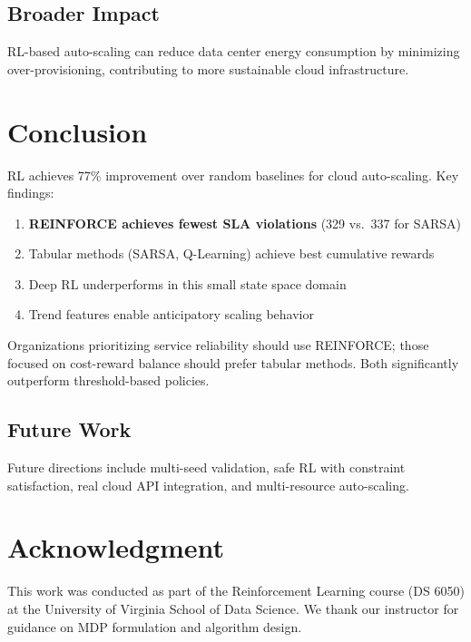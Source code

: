 \documentclass[conference]{IEEEtran}
\begin{document}
\subsection{Broader Impact}
RL-based auto-scaling can reduce data center energy consumption by minimizing over-provisioning, contributing to more sustainable cloud infrastructure.

\section{Conclusion}

RL achieves 77\% improvement over random baselines for cloud auto-scaling. Key findings:
\begin{enumerate}
    \item \textbf{REINFORCE achieves fewest SLA violations} (329 vs.\ 337 for SARSA)
    \item Tabular methods (SARSA, Q-Learning) achieve best cumulative rewards
    \item Deep RL underperforms in this small state space domain
    \item Trend features enable anticipatory scaling behavior
\end{enumerate}

Organizations prioritizing service reliability should use REINFORCE; those focused on cost-reward balance should prefer tabular methods. Both significantly outperform threshold-based policies.

\subsection{Future Work}
Future directions include multi-seed validation, safe RL with constraint satisfaction, real cloud API integration, and multi-resource auto-scaling.

\section*{Acknowledgment}
This work was conducted as part of the Reinforcement Learning course (DS 6050) at the University of Virginia School of Data Science. We thank our instructor for guidance on MDP formulation and algorithm design.
\end{document}
